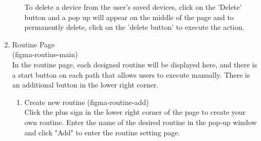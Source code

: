 \begin{enumerate}[label=\arabic*.]
\begin{enumerate}[label=\alph*]
              To delete a device from the user's saved devices, click on the 'Delete' button and a pop up
                    will appear on the middle of the page and to permanently delete, click on the 'delete button' to execute the action. \\
          \end{enumerate}

    \item {\large{Routine Page}}\\
                    (figma-routine-main)\\
          In the routine page, each designed routine will be displayed here, and there is a start button on each path that allows users to execute manually. There is an additional button in the lower right corner.\\
          \begin{enumerate}[label=\alph*]
              \item Create new routine
                    (figma-routine-add)\\
                    Click the plus sign in the lower right corner of the page to create your own routine. Enter the name of the desired routine in the pop-up window and click "Add" to enter the routine setting page.\\



\end{enumerate}
\end{enumerate}
